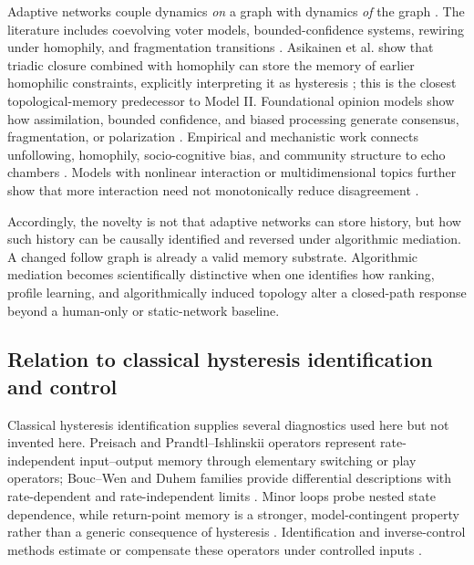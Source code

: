\documentclass[pdflatex,sn-mathphys-num]{sn-jnl}
\begin{document}
Adaptive networks couple dynamics \emph{on} a graph with dynamics \emph{of} the graph \cite{gross2008adaptive}. The literature includes coevolving voter models, bounded-confidence systems, rewiring under homophily, and fragmentation transitions \cite{holme2006nonequilibrium,kozma2008consensus,gil2006coevolution,vazquez2008adaptive,kan2023adaptive,li2025adaptive}. Asikainen et al. show that triadic closure combined with homophily can store the memory of earlier homophilic constraints, explicitly interpreting it as hysteresis \cite{asikainen2020cumulative}; this is the closest topological-memory predecessor to Model II. Foundational opinion models show how assimilation, bounded confidence, and biased processing generate consensus, fragmentation, or polarization \cite{deffuant2000mixing,castellano2009statistical,dandekar2013assimilation}. Empirical and mechanistic work connects unfollowing, homophily, socio-cognitive bias, and community structure to echo chambers \cite{sasahara2021unfollowing,wang2020public,cinelli2021echo}. Models with nonlinear interaction or multidimensional topics further show that more interaction need not monotonically reduce disagreement \cite{baumann2020echo,baumann2021topics,thurner2025interactions}.

Accordingly, the novelty is not that adaptive networks can store history, but how such history can be causally identified and reversed under algorithmic mediation. A changed follow graph is already a valid memory substrate. Algorithmic mediation becomes scientifically distinctive when one identifies how ranking, profile learning, and algorithmically induced topology alter a closed-path response beyond a human-only or static-network baseline.

\subsection{Relation to classical hysteresis identification and control}

Classical hysteresis identification supplies several diagnostics used here but not invented here. Preisach and Prandtl--Ishlinskii operators represent rate-independent input--output memory through elementary switching or play operators; Bouc--Wen and Duhem families provide differential descriptions with rate-dependent and rate-independent limits \cite{preisach1935magnetic,macki1993mathematical,hassani2014survey,oh2005duhem}. Minor loops probe nested state dependence, while return-point memory is a stronger, model-contingent property rather than a generic consequence of hysteresis \cite{sethna1993hierarchies,mungan2019returnpoint}. Identification and inverse-control methods estimate or compensate these operators under controlled inputs \cite{krejci2001inverse,ikhouane2007systems}.
\end{document}
